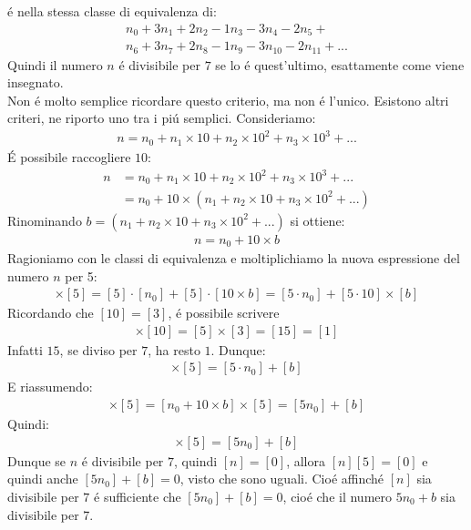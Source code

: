 \documentclass[twoside]{article} %
\begin{document}
	\'e nella stessa classe di equivalenza di:
		\begin{gather*}
		n_0+3n_1+2n_2-1n_3-3n_4-2n_5+\\
		n_6+3n_7+2n_8-1n_9-3n_{10}-2n_{11}+...
	\end{gather*}	
	Quindi il numero $n$ \'e divisibile per $7$ se lo \'e quest'ultimo, esattamente come viene insegnato.\\
	Non \'e molto semplice ricordare questo criterio, ma non \'e l'unico. Esistono altri criteri, ne riporto uno tra i pi\'u semplici. Consideriamo:
	\begin{align*}
		n=n_0+n_1\times 10+n_2\times 10^2+n_3\times 10^3+...
	\end{align*}
	\'E possibile raccogliere $10$:
	\begin{align*}
		n&=n_0+n_1\times 10+n_2\times 10^2+n_3\times 10^3+...\\
		 &=n_0+10\times (n_1+n_2\times 10+n_3\times 10^2+...)
	\end{align*}
	Rinominando $b=(n_1+n_2\times 10+n_3\times 10^2+...)$ si ottiene:
	\begin{gather*}
		n=n_0+10\times b
	\end{gather*}
	\newpage
	\noindent Ragioniamo con le classi di equivalenza e moltiplichiamo la nuova espressione del numero $n$ per 5:
	\begin{gather*}
		[n_0+10\times b]\times [5]=[5]\cdot [n_0]+[5]\cdot [10\times b]=[5\cdot n_0]+[5\cdot 10]\times [b]
	\end{gather*}
	Ricordando che $[10]=[3]$, \'e possibile scrivere
	\begin{gather*}
		[5]\times [10]=[5]\times [3]=[15]=[1]
	\end{gather*}	
	Infatti $15$, se diviso per $7$, ha resto $1$. Dunque:
	\begin{gather*}
		[n_0+10\times b]\times [5]=[5\cdot n_0]+[b]
	\end{gather*}
	E riassumendo:	
	\begin{gather*}
		[n]\times [5]=[n_0+10\times b]\times [5]=[5n_0]+ [b]
	\end{gather*}
	Quindi:
	\begin{gather*}
		[n]\times [5]=[5n_0]+ [b]
	\end{gather*}
	Dunque se $n$ \'e divisibile per $7$, quindi $[n]=[0]$, allora $[n][5]=[0]$ e quindi anche $[5n_0]+[b]=0$, visto che sono uguali. Cio\'e affinch\'e $[n]$ sia divisibile per $7$ \'e sufficiente che $[5n_0]+[b]=0$, cio\'e che il numero $5n_0+b$ sia divisibile per 7.
	\newpage
\end{document}
